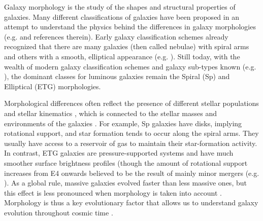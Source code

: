 \documentclass[fleqn,usenatbib]{mnras}
\begin{document}
Galaxy morphology is the study of the shapes and structural properties of galaxies. Many different classifications of galaxies have been proposed in an attempt to understand the physics behind the differences in galaxy morphologies (e.g. \citealp{Zwicky1940,Vaucouleurs1959,vandenbergh1998} and references therein). Early galaxy classification schemes already recognized that there are many galaxies (then called nebulae) with spiral arms and others with a smooth, elliptical appearance (e.g. \citealt{Herschel1864}). Still today, with the wealth of  modern galaxy classification schemes and galaxy sub-types known (e.g. \citealt{Borne1999}), the dominant classes for luminous galaxies remain the Spiral (Sp) and Elliptical (ETG) morphologies.


Morphological differences often reflect the presence of different stellar populations \citep{Sanchez2007} and stellar kinematics \citep{Edelen1969,Wang2020}, which is connected to the stellar masses  and environments of the galaxies \citep{Calvi2012,Crossett2014,Sarkar2020,Wu2020}. For example, Sp galaxies have disks, implying rotational support, and star formation tends to occur along the spiral arms. They usually have access to a reservoir of gas to maintain their star-formation activity. In contrast, ETG galaxies are pressure-supported systems and have much smoother surface brightness profiles (though the amount of rotational support increases from E4 onwards believed to be the result of mainly minor mergers (e.g. \citealt{Kormendy2009,Naab2009,Forbes2011,Bernardi2019}). 
As a global rule, massive galaxies evolved faster than less massive ones, but this effect is less pronounced when morphology is taken into account \citep{Camps2020,peng2010mass, bamford2009galaxy}. Morphology is thus a key evolutionary factor that allows us to understand galaxy evolution throughout cosmic time  \citep[e.g. ][]{Shao2015,van2001evolution,kraljic2014links, buitrago2013early}.
\end{document}
